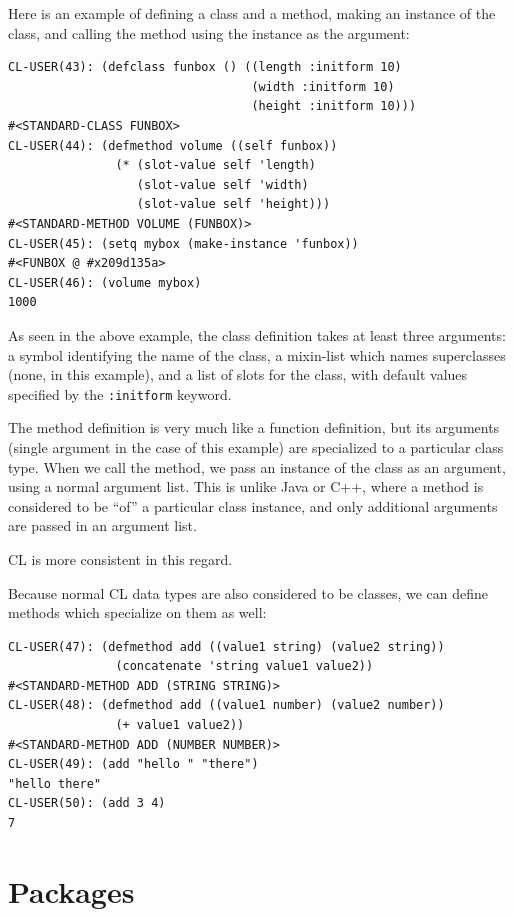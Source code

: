Here is an example of defining a class and a method, making an instance of the class,
and calling the method using the instance as the argument:

\begin{verbatim}
CL-USER(43): (defclass funbox () ((length :initform 10)
                                  (width :initform 10)
                                  (height :initform 10)))
#<STANDARD-CLASS FUNBOX>
CL-USER(44): (defmethod volume ((self funbox))
               (* (slot-value self 'length)
                  (slot-value self 'width)
                  (slot-value self 'height)))
#<STANDARD-METHOD VOLUME (FUNBOX)>
CL-USER(45): (setq mybox (make-instance 'funbox))
#<FUNBOX @ #x209d135a>
CL-USER(46): (volume mybox)
1000
\end{verbatim}

As seen in the above example, the class definition takes at least three arguments: a symbol
identifying the name of the class, a mixin-list which names superclasses (none, in this
example), and a list of slots for the class, with default values specified by the \texttt{:initform}
keyword.

The method definition is very much like a function definition, but its arguments (single
argument in the case of this example) are specialized to a particular class type. When we
call the method, we pass an instance of the class as an argument, using a normal argument
list. This is unlike Java or C++, where a method is considered to be ``of'' a particular class
instance, and only additional arguments are passed in an argument list.

CL is more consistent in this regard.

Because normal CL data types are also considered to be classes, we can define methods
which specialize on them as well:

\begin{verbatim}
CL-USER(47): (defmethod add ((value1 string) (value2 string))
               (concatenate 'string value1 value2))
#<STANDARD-METHOD ADD (STRING STRING)>
CL-USER(48): (defmethod add ((value1 number) (value2 number))
               (+ value1 value2))
#<STANDARD-METHOD ADD (NUMBER NUMBER)>
CL-USER(49): (add "hello " "there")
"hello there"
CL-USER(50): (add 3 4)
7
\end{verbatim}

\section{Packages}

